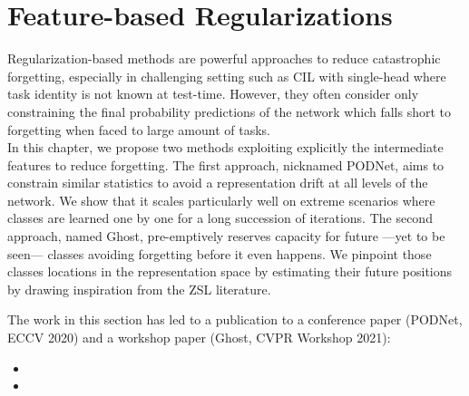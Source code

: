 \chapter{Feature-based Regularizations}
\label{chapter:regularization}

\newcommand{\tableindent}{\,\,\,\,}
\newcommand{\vt}{\mathbf{t}}
\newcommand{\std}{$\pm\,$}
\newcommand{\clf}{\textit{clf}} \newcommand{\gray}[1]{{\color{darkgray}#1}}


\begin{chapabstract}
    Regularization-based methods are powerful approaches to reduce catastrophic forgetting,
    especially in challenging setting such as \ac{CIL} with single-head where task identity is not
    known at test-time. However, they often consider only constraining the final probability
    predictions of the network which falls short to forgetting when faced to large amount of tasks.
    \\
    In this chapter, we propose two methods exploiting explicitly the intermediate features to
    reduce forgetting. The first approach, nicknamed PODNet, aims to constrain similar statistics to
    avoid a representation drift at all levels of the network. We show that it scales particularly
    well on extreme scenarios where classes are learned one by one for a long succession of
    iterations. The second approach, named Ghost, pre-emptively reserves capacity for future ---yet
    to be seen--- classes avoiding forgetting before it even happens. We pinpoint those classes
    locations in the representation space by estimating their future positions by drawing
    inspiration from the \ac{ZSL} literature.

    The work in this section has led to a publication to a conference paper (PODNet, ECCV 2020) and
    a workshop paper (Ghost, CVPR Workshop 2021):

    \begin{itemize}
        \item {}
        \item {}
    \end{itemize}

\end{chapabstract}
\newpage

\minitoc
{}

